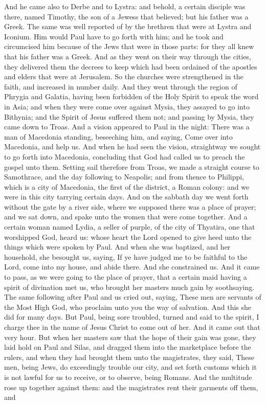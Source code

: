 And he came also to Derbe and to Lystra: and behold, a certain disciple was there, named Timothy, the son of a Jewess that believed; but his father was a Greek. The same was well reported of by the brethren that were at Lystra and Iconium. Him would Paul have to go forth with him; and he took and circumcised him because of the Jews that were in those parts: for they all knew that his father was a Greek. And as they went on their way through the cities, they delivered them the decrees to keep which had been ordained of the apostles and elders that were at Jerusalem. So the churches were strengthened in the faith, and increased in number daily.  And they went through the region of Phrygia and Galatia, having been forbidden of the Holy Spirit to speak the word in Asia; and when they were come over against Mysia, they assayed to go into Bithynia; and the Spirit of Jesus suffered them not; and passing by Mysia, they came down to Troas. And a vision appeared to Paul in the night: There was a man of Macedonia standing, beseeching him, and saying, Come over into Macedonia, and help us. And when he had seen the vision, straightway we sought to go forth into Macedonia, concluding that God had called us to preach the gospel unto them.  Setting sail therefore from Troas, we made a straight course to Samothrace, and the day following to Neapolis; and from thence to Philippi, which is a city of Macedonia, the first of the district, a Roman colony: and we were in this city tarrying certain days. And on the sabbath day we went forth without the gate by a river side, where we supposed there was a place of prayer; and we sat down, and spake unto the women that were come together. And a certain woman named Lydia, a seller of purple, of the city of Thyatira, one that worshipped God, heard us: whose heart the Lord opened to give heed unto the things which were spoken by Paul. And when she was baptized, and her household, she besought us, saying, If ye have judged me to be faithful to the Lord, come into my house, and abide there. And she constrained us.  And it came to pass, as we were going to the place of prayer, that a certain maid having a spirit of divination met us, who brought her masters much gain by soothsaying. The same following after Paul and us cried out, saying, These men are servants of the Most High God, who proclaim unto you the way of salvation. And this she did for many days. But Paul, being sore troubled, turned and said to the spirit, I charge thee in the name of Jesus Christ to come out of her. And it came out that very hour.  But when her masters saw that the hope of their gain was gone, they laid hold on Paul and Silas, and dragged them into the marketplace before the rulers, and when they had brought them unto the magistrates, they said, These men, being Jews, do exceedingly trouble our city, and set forth customs which it is not lawful for us to receive, or to observe, being Romans. And the multitude rose up together against them: and the magistrates rent their garments off them, and 